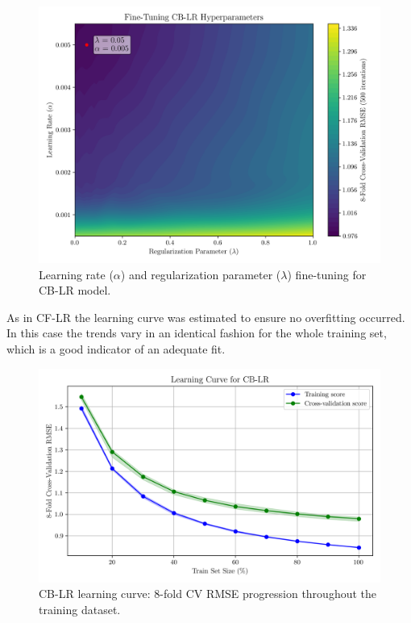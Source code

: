 \documentclass[conference]{IEEEtran}
\begin{document}
\begin{figure}[H]
    \centering
    \includegraphics[width=1\linewidth]{assets/model02_hyperparemeterstunning.png}
    \caption{Learning rate ($\alpha$) and regularization parameter ($\lambda$) fine-tuning for CB-LR model.}
    \label{fig:model02_hyperparemeterstunning}
\end{figure}


As in CF-LR the learning curve was estimated to ensure no overfitting occurred. In this case the trends vary in an identical fashion for the whole training set, which is a good indicator of an adequate fit. 

\begin{figure}[H]
    \centering
    \includegraphics[width=1\linewidth]{assets/model02_learning_curve.png}
    \caption{CB-LR learning curve: 8-fold CV RMSE progression throughout the training dataset.}
    \label{fig:model02_learning_curve}
\end{figure}
\end{document}
